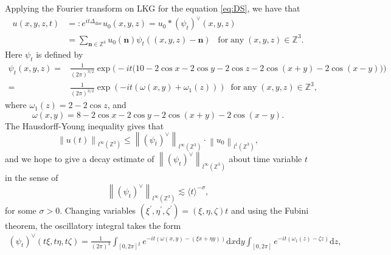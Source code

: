 \documentclass[12pt]{amsart}
\newcommand\JP[1]{\langle#1\rangle}
\newcommand{\Z}{\mathbb{Z}}
\def\d{\mathrm{d}}
\begin{document}
Applying the Fourier transform on LKG for the equation \eqref{eq:DS}, we have that
    \begin{equation*}
         \begin{aligned} u\left(x,y,z,t\right)&=:e^{it\Delta_{\mathrm{disc}}}u_{0}\left(x,y,z\right)=u_{0}\ast\left(\psi_{t}\right)^{\vee}\left(x,y,z\right)\\
         &=\sum_{\mathbf{n}\in\Z^{3}}u_{0}\left(\mathbf{n}\right)\psi_{t}\left(\left(x,y,z\right)-\mathbf{n}\right)\;\;\mathrm{\;for\;any\;}\left(x,y,z\right)\in\Z^{3}.
		\end{aligned}
	\end{equation*}
Here $\psi_{t}$ is defined by
\begin{equation*}
    \begin{aligned}
	\psi_{t}\left(x,y,z\right)=&\frac{1}{\left(2\pi\right)^{3/2}}\exp\Big(-it\big(10-2\cos x-2\cos y-2\cos z-2\cos\left(x+y\right)-2\cos\left(x-y\right)\big)\Big)\\ 
    =&\frac{1}{\left(2\pi\right)^{3/2}}\exp\left(-it \left(\omega\left(x,y\right)+\omega_{1}\left(z\right)\right)\right)\;\;\mathrm{for \;any}\;\left(x,y,z\right)\in\Z^{3},
    \end{aligned}
\end{equation*}
where  $\omega_{1}\left(z\right)=2-2\cos z$, and 
\begin{equation}\label{eq:omega} \omega\left(x,y\right)=8-2\cos x-2\cos y-2\cos\left(x+y\right)-2\cos\left(x-y\right).
\end{equation}
The Hausdorff-Young inequality gives that
\begin{equation}\label{eq:HY}
    \left\| u\left(t\right)\right\|_{l^{\infty}\left(\mathbb{Z}^{3}\right)}\leq\left\| \left(\psi_{t}\right)^{\vee}\right\|_{l^{\infty}\left(\mathbb{Z}^{3}\right)}\cdot\left\| u_{0}\right\|_{l^{1}\left(\mathbb{Z}^{3}\right)},
	\end{equation}
and we hope to give a decay estimate of $\left\| \left(\psi_{t}\right)^{\vee}\right\|_{l^{\infty}\left(\mathbb{Z}^{3}\right)}$ about time variable $t$ in the sense of 
\begin{equation*}
    \left\| \left(\psi_{t}\right)^{\vee}\right\|_{l^{\infty}\left(\mathbb{Z}^{3}\right)}\lesssim\JP{t}^{-\sigma},
\end{equation*}
for some $\sigma>0$. Changing variables $\left(\xi^{\prime},\eta^{\prime},\zeta^{\prime}\right)=\left(\xi,\eta,\zeta\right)t$ and using the Fubini theorem, the oscillatory integral takes the form
	\begin{equation*}
		\begin{aligned}
			\left(\psi_{t}\right)^{\vee}\left(t\xi,t\eta,t\zeta\right)=\frac{1}{\left(2\pi\right)^{3}}\int_{\left[0,2\pi\right]^{2}}e^{-it\left(\omega\left(x,y\right)-\left(\xi x+\eta y\right)\right)}\d x\d y\int_{\left[0,2\pi\right]}e^{-it\left(\omega_{1}\left(z\right)-\zeta z\right)}\d z,
		\end{aligned}
	\end{equation*} 
\end{document}
